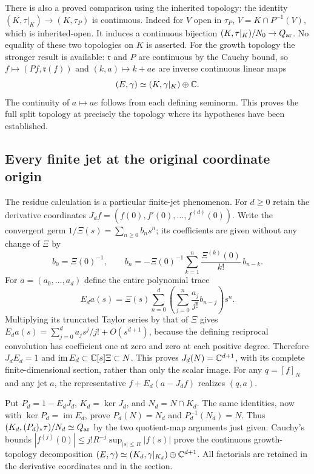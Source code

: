There is also a proved comparison using the inherited topology:
the identity $(K,\tau|_K)\to(K,\tau_P)$ is continuous.
Indeed for $V$ open in $\tau_P$,
$V=K\cap P^{-1}(V)$, which is inherited-open.
It induces a continuous bijection
$(K,\tau|_K)/N_0\to Q_{\rm ar}$.
No equality of these two topologies on $K$ is asserted.
For the growth topology the stronger result is available:
$\mathfrak r$ and $P$ are continuous by the Cauchy bound,
so $f\mapsto(Pf,\mathfrak r(f))$ and
$(k,a)\mapsto k+ae$ are inverse continuous linear maps
\begin{equation}
 (E,\gamma)\simeq (K,\gamma|_K)\oplus\mathbb C .
 \label{eq:cq-residue-growth-splitting}
\end{equation}
The continuity of $a\mapsto ae$ follows from each defining
seminorm. This proves the full split topology at precisely
the topology where its hypotheses have been established.

\subsection{Every finite jet at the original coordinate origin}
The residue calculation is a particular finite-jet phenomenon.
For $d\ge0$ retain the derivative coordinates
$J_d f=(f(0),f'(0),\ldots,f^{(d)}(0))$.
Write the convergent germ
$1/\Xi(s)=\sum_{n\ge0}b_ns^n$; its coefficients are given
without any change of $\Xi$ by
\[
 b_0=\Xi(0)^{-1},\qquad
 b_n=-\Xi(0)^{-1}
       \sum_{k=1}^n\frac{\Xi^{(k)}(0)}{k!}\,b_{n-k}.
\]
For $a=(a_0,\ldots,a_d)$ define the entire polynomial trace
\begin{equation}
 E_da(s)=\Xi(s)\sum_{n=0}^d
           \left(\sum_{j=0}^n\frac{a_j}{j!}b_{n-j}\right)s^n.
 \label{eq:cq-origin-jet-section}
\end{equation}
Multiplying its truncated Taylor series by that of $\Xi$
gives $E_da(s)=\sum_{j=0}^d a_js^j/j!+O(s^{d+1})$,
because the defining reciprocal convolution has coefficient
one at zero and zero at each positive degree.
Therefore $J_dE_d=1$ and
$\operatorname{im}E_d\subset\mathbb C[s]\Xi\subset N$.
This proves $J_d(N)=\mathbb C^{d+1}$, with its complete
finite-dimensional section, rather than only the scalar image.
For any $q=[f]_N$ and any jet $a$, the representative
$f+E_d(a-J_df)$ realizes $(q,a)$.

Put $P_d=1-E_dJ_d$, $K_d=\ker J_d$, and
$N_d=N\cap K_d$. The same identities, now with
$\ker P_d=\operatorname{im}E_d$, prove
$P_d(N)=N_d$ and $P_d^{-1}(N_d)=N$.
Thus $(K_d,(P_d)_*\tau)/N_d\simeq Q_{\rm ar}$ by the
two quotient-map arguments just given. Cauchy's bounds
$|f^{(j)}(0)|\le j!R^{-j}\sup_{|s|\le R}|f(s)|$
prove the continuous growth-topology decomposition
$(E,\gamma)\simeq (K_d,\gamma|_{K_d})\oplus\mathbb C^{d+1}$.
All factorials are retained in the derivative coordinates
and in the section.

